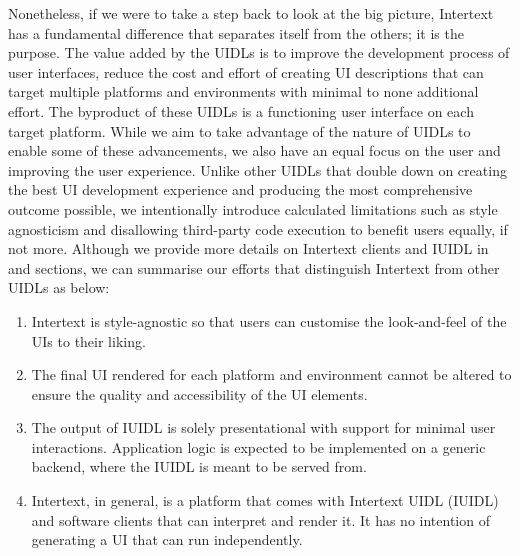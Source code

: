 Nonetheless, if we were to take a step back to look at the big picture, Intertext has a fundamental difference that separates itself from the others; it is the purpose. The value added by the UIDLs is to improve the development process of user interfaces, reduce the cost and effort of creating UI descriptions that can target multiple platforms and environments with minimal to none additional effort. The byproduct of these UIDLs is a functioning user interface on each target platform. While we aim to take advantage of the nature of UIDLs to enable some of these advancements, we also have an equal focus on the user and improving the user experience. Unlike other UIDLs that double down on creating the best UI development experience and producing the most comprehensive outcome possible, we intentionally introduce calculated limitations such as style agnosticism and disallowing third-party code execution to benefit users equally, if not more. Although we provide more details on Intertext clients and IUIDL in  and  sections, we can summarise our efforts that distinguish Intertext from other UIDLs as below:

\begin{enumerate}
  \item Intertext is style-agnostic so that users can customise the look-and-feel of the UIs to their liking.
  
  \item The final UI rendered for each platform and environment cannot be altered to ensure the quality and accessibility of the UI elements.
  
  \item The output of IUIDL is solely presentational with support for minimal user interactions. Application logic is expected to be implemented on a generic backend, where the IUIDL is meant to be served from.

  \item Intertext, in general, is a platform that comes with Intertext UIDL (IUIDL) and software clients that can interpret and render it. It has no intention of generating a UI that can run independently.
\end{enumerate}
